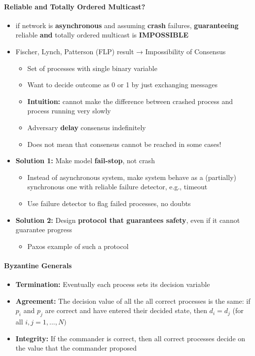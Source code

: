\paragraph{Reliable and Totally Ordered Multicast?}
\begin{itemize}
\item if network is \textbf{asynchronous} and assuming \textbf{crash}
  failures, \textbf{guaranteeing} reliable \textbf{and} totally
  ordered multicast is \textbf{IMPOSSIBLE}

\item Fischer, Lynch, Patterson (FLP) result →
  Impossibility of Consensus
  \begin{itemize}
  \item Set of processes with single binary variable
  \item Want to decide outcome as 0 or 1 by just exchanging messages
  \item \textbf{Intuition:} cannot make the difference between
    crashed process and process running very slowly
  \item Adversary \textbf{delay} consensus indefinitely
  \item Does not mean that consensus cannot be reached in some cases!
  \end{itemize}
\end{itemize}

\begin{itemize}
\item \textbf{Solution 1:} Make model \textbf{fail-stop}, not crash
  \begin{itemize}
  \item Instead of asynchronous system, make system
    behave as a (partially) synchronous one with reliable
    failure detector, e.g., timeout
  \item Use failure detector to flag failed processes, no doubts
  \end{itemize}

\item \textbf{Solution 2:} Design
  \textbf{protocol that guarantees safety}, even if it cannot
  guarantee progress
  \begin{itemize}
  \item Paxos example of such a protocol
  \end{itemize}
\end{itemize}


\paragraph{Byzantine Generals}
\begin{itemize}
\item \textbf{Termination:} Eventually each process sets its
  decision variable
\item \textbf{Agreement:} The decision value of all the
   all correct processes is the same:
  if $p_i$ and $p_j$ are correct and have entered
  their decided state, then $d_i = d_j$ (for all $i,j = 1,...,N)$
\item \textbf{Integrity:} If the commander is correct, then all
  correct processes decide on the value that the commander proposed
\end{itemize}

